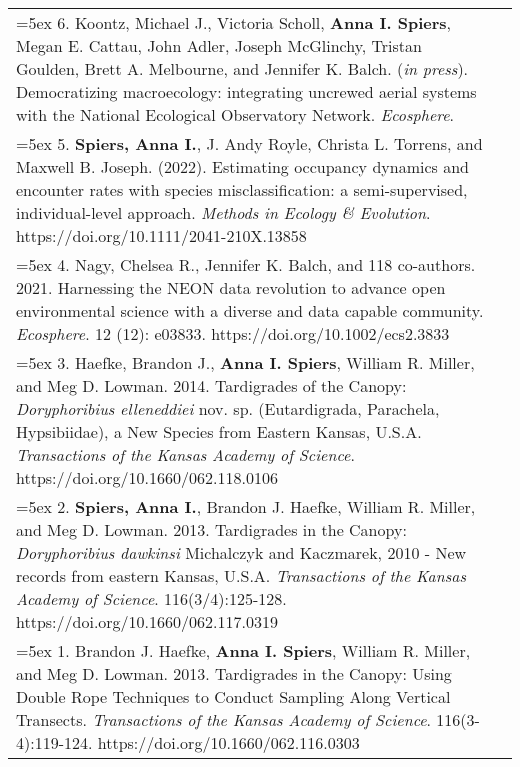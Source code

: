 \begin{longtable}{@{} >{\raggedright}p{6.10in} >{\raggedleft}X @{}}

\hangindent=5ex 6. Koontz, Michael J., Victoria Scholl, \textbf{Anna I. Spiers}, Megan E. Cattau, John Adler, Joseph McGlinchy, Tristan Goulden, Brett A. Melbourne, and Jennifer K. Balch. (\emph{in press}). Democratizing macroecology: integrating uncrewed aerial systems with the National Ecological Observatory Network. \emph{Ecosphere}.  &  \tabularnewline

\hangindent=5ex 5. \textbf{Spiers, Anna I.}, J. Andy Royle, Christa L. Torrens, and Maxwell B. Joseph. (2022). Estimating occupancy dynamics and encounter rates with species misclassification: a semi-supervised, individual-level approach. \emph{Methods in Ecology \& Evolution}. https://doi.org/10.1111/2041-210X.13858  &  \tabularnewline

\hangindent=5ex 4. Nagy, Chelsea R., Jennifer K. Balch, and 118 co-authors. 2021. Harnessing the NEON data revolution to advance open environmental science with a diverse and data capable community. \emph{Ecosphere}. 12 (12): e03833. https://doi.org/10.1002/ecs2.3833  &  \tabularnewline

\hangindent=5ex 3. Haefke, Brandon J., \textbf{Anna I. Spiers}, William R. Miller, and Meg D. Lowman. 2014. Tardigrades of the Canopy: \emph{Doryphoribius elleneddiei} nov. sp. (Eutardigrada, Parachela, Hypsibiidae), a New Species from Eastern Kansas, U.S.A. \emph{Transactions of the Kansas Academy of Science}. https://doi.org/10.1660/062.118.0106  &  \tabularnewline

\hangindent=5ex 2. \textbf{Spiers, Anna I.}, Brandon J. Haefke, William R. Miller, and Meg D. Lowman. 2013. Tardigrades in the Canopy: \emph{Doryphoribius dawkinsi} Michalczyk and Kaczmarek, 2010 - New records from eastern Kansas, U.S.A. \emph{Transactions of the Kansas Academy of Science}. 116(3/4):125-128. https://doi.org/10.1660/062.117.0319  &  \tabularnewline

\hangindent=5ex 1. Brandon J. Haefke, \textbf{Anna I. Spiers}, William R. Miller, and Meg D. Lowman. 2013. Tardigrades in the Canopy: Using Double Rope Techniques to Conduct Sampling Along Vertical Transects. \emph{Transactions of the Kansas Academy of Science}. 116(3-4):119-124. https://doi.org/10.1660/062.116.0303  &  \tabularnewline

\end{longtable}
